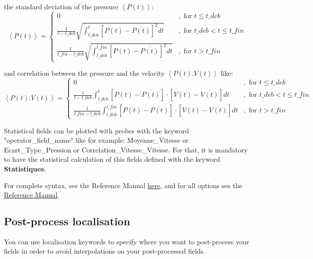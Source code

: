 \begin{itemize}
the standard deviation of the pressure $\left\langle P(t)\right\rangle$:
\[
\left\langle P(t)\right\rangle=\left\{ \begin{array}{ll}
0 & ,\mbox{ for }t\leq t\mbox{\_}deb\\
\frac{1}{t-t\mbox{\_}deb}{\displaystyle \sqrt{\int_{t\mbox{\_}deb}^{t}\left[P(t)-\overline{P(t)}\right]^{2}dt}} & ,\mbox{ for }t\mbox{\_}deb<t\leq t\mbox{\_}fin\\
\frac{1}{t\mbox{\_}fin-t\mbox{\_}deb}{\displaystyle \sqrt{\int_{t\mbox{\_}deb}^{t\mbox{\_}fin}\left[P(t)-\overline{P(t)}\right]^{2}dt}} & ,\mbox{ for }t>t\mbox{\_}fin
\end{array}\right.
\]

and correlation between the pressure and the velocity $\left\langle P(t).V(t)\right\rangle$ like:
\[
\left\langle P(t).V(t)\right\rangle=\left\{ \begin{array}{ll}
0 & ,\mbox{ for }t\leq t\mbox{\_}deb\\
\frac{1}{t-t\mbox{\_}deb}{\displaystyle \int_{t\mbox{\_}deb}^{t}\left[P(t)-\overline{P(t)}\right]\cdot\left[V(t)-\overline{V(t)}\right]dt} & ,\mbox{ for }t\mbox{\_}deb<t\leq t\mbox{\_}fin\\
\frac{1}{t\mbox{\_}fin-t\mbox{\_}deb}{\displaystyle \int_{t\mbox{\_}deb}^{t\mbox{\_}fin}\left[P(t)-\overline{P(t)}\right]\cdot\left[V(t)-\overline{V(t)}\right]dt} & ,\mbox{ for }t>t\mbox{\_}fin
\end{array}\right.
\]


\begin{remark}
Statistical fields can be plotted with probes with the keyword "operator\_field\_name" like for example: Moyenne\_Vitesse or Ecart\_Type\_Pression or Correlation\_Vitesse\_Vitesse. For that, it is mandatory to have the statistical calculation of this fields defined with the keyword \textbf{Statistiques}.\\
\end{remark}

For complete syntax, see the \trust Reference Manual \href{TRUST_Reference_Manual.pdf\#corpspostraitement}{here}, and for all options see the \href{TRUST_Reference_Manual.pdf\#statsposts}{\trust Reference Manual}.
\end{itemize}



\subsection{Post-process localisation}
You can use localisation keywords to specify where you want to post-process your fields in order to avoid interpolations on your post-processed fields.\\

